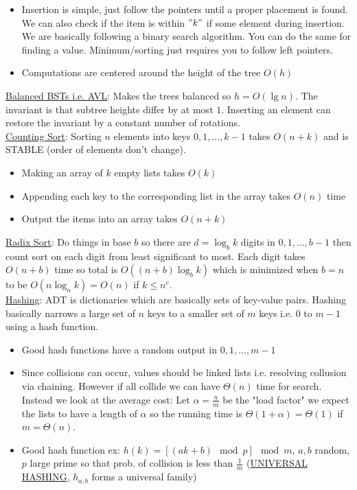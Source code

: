 \documentclass{article}
\begin{document}
\vspace{-1mm}
\begin{itemize}
\item Insertion is simple, just follow the pointers until a proper placement is found. We can also check if the item is within $"k"$ if some element during insertion. We are basically following a binary search algorithm. You can do the same for finding a value. Minimum/sorting just requires you to follow left pointers.
\item Computations are centered around the height of the tree $O(h)$
\end{itemize}
\vspace{-1mm}
\underline{Balanced BSTs i.e. AVL}: Makes the trees balanced so $h=O(\lg n)$. The invariant is that subtree heights differ by at most $1$. Inserting an element can restore the invariant by a constant number of rotations.\\
\underline{Counting Sort}: Sorting $n$ elements into keys ${0, 1, ..., k-1}$ takes $O(n+k)$ and is STABLE (order of elements don't change).
\vspace{-5mm}
\begin{itemize}
\item Making an array of $k$ empty lists takes $O(k)$
\item Appending each key to the corresponding list in the array takes $O(n)$ time
\item Output the items into an array takes $O(n+k)$ 
\end{itemize}
\vspace{-1mm}
\underline{Radix Sort}: Do things in base $b$ so there are $d=\log_b k$ digits in ${0,1,..., b-1}$ then count sort on each digit from least significant to most. Each digit takes $O(n+b)$ time so total is $O((n+b)\log_b k)$ which is minimized when $b=n$ to be $O(n\log_n k)=O(n)$ if $k\leq n^c$.\\
\underline{Hashing}: ADT is dictionaries which are basically sets of key-value pairs. Hashing basically narrows a large set of $n$ keys to a smaller set of $m$ keys i.e. $0$ to $m-1$ using a hash function.
\vspace{-1mm}
\begin{itemize}
\item Good hash functions have a random output in $0,1,...,m-1$
\item Since collisions can occur, values should be linked lists i.e. resolving collusion via chaining. However if all collide we can have $\Theta(n)$ time for search. Instead we look at the average cost: Let $\alpha=\frac{n}{m}$ be the "load factor" we expect the lists to have a length of $\alpha$ so the running time is $\Theta(1+\alpha)=\Theta(1)$ if $m=\Theta(n)$.
\item Good hash function ex: $h(k)=[(ak+b)\mod p]\mod m$, $a,b$ random, $p$ large prime so that prob. of collision is less than $\frac{1}{m}$ (\underline{UNIVERSAL HASHING}, $h_{a,b}$ forms a universal family)
\end{itemize}
\end{document}
